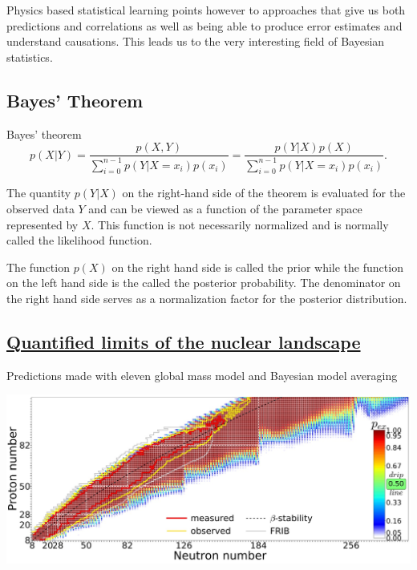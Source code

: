 \documentclass[%
oneside,                 %
final,                   %
10pt]{article}
\begin{document}
Physics based statistical learning points however to approaches that give us both predictions and correlations as well as being able to produce error estimates and understand causations.  This leads us to the very interesting field of Bayesian statistics.

\subsection{Bayes' Theorem}

Bayes' theorem
\[
p(X\vert Y)= \frac{p(X,Y)}{\sum_{i=0}^{n-1}p(Y\vert X=x_i)p(x_i)}=\frac{p(Y\vert X)p(X)}{\sum_{i=0}^{n-1}p(Y\vert X=x_i)p(x_i)}.
\]

The quantity $p(Y\vert X)$ on the right-hand side of the theorem is
evaluated for the observed data $Y$ and can be viewed as a function of
the parameter space represented by $X$. This function is not
necessarily normalized and is normally called the likelihood function.

The function $p(X)$ on the right hand side is called the prior while the function on the left hand side is the called the posterior probability. The denominator on the right hand side serves as a normalization factor for the posterior distribution.

\subsection{\href{{https://journals.aps.org/prc/abstract/10.1103/PhysRevC.101.044307}}{Quantified limits of the nuclear landscape}}

Predictions made with eleven global mass model and Bayesian model averaging

\vspace{6mm}

\centerline{\includegraphics[width=1.0\linewidth]{figures/landscape.jpg}}

\vspace{6mm}
\end{document}
